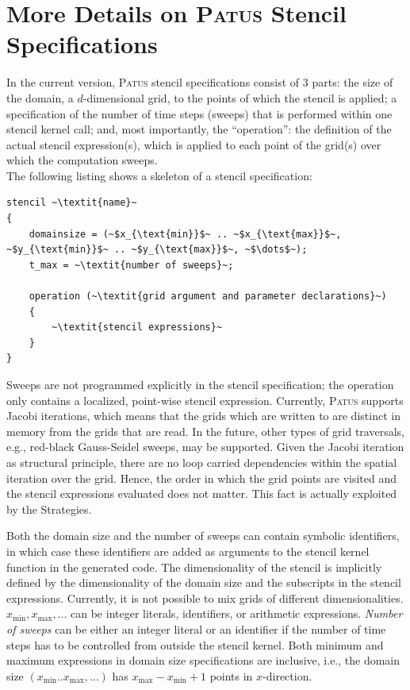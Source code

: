 \chapter{More Details on \textsc{Patus} Stencil Specifications}

In the current version, \textsc{Patus} stencil specifications consist of $3$ parts: the size of the domain,
a $d$-dimensional grid, to the points of which the stencil is applied; a specification of the number of
time steps (sweeps) that is performed within one stencil kernel call;
and, most importantly, the ``operation'': the definition of the actual stencil expression(s), which is
applied to each point of the grid(s) over which the computation sweeps.\\
The following listing shows a skeleton of a stencil specification:
\begin{lstlisting}[language=stencil]
stencil ~\textit{name}~
{
    domainsize = (~$x_{\text{min}}$~ .. ~$x_{\text{max}}$~, ~$y_{\text{min}}$~ .. ~$y_{\text{max}}$~, ~$\dots$~);
    t_max = ~\textit{number of sweeps}~;

    operation (~\textit{grid argument and parameter declarations}~)
    {
    	~\textit{stencil expressions}~
    }
}
\end{lstlisting}

Sweeps are not programmed explicitly
in the stencil specification; the operation only contains a localized, point-wise stencil expression.
Currently, \textsc{Patus} supports Jacobi iterations, which means that the
grids which are written to are distinct in memory from the grids that are read. In the future, other types
of grid traversals, e.g., red-black Gauss-Seidel sweeps, may be supported. Given the Jacobi iteration as
structural principle, there are no loop carried dependencies within the spatial iteration over the
grid. Hence, the order in which the grid points are visited and the stencil expressions evaluated does not
matter. This fact is actually exploited by the Strategies.

Both the domain size and the number of sweeps can contain symbolic identifiers, in which case these identifiers
are added as arguments to the stencil kernel function in the generated code.
The dimensionality of the stencil is implicitly defined by the dimensionality of the domain size and the
subscripts in the stencil expressions. Currently, it is not possible to mix grids of different dimensionalities.
$x_{\text{min}}, x_{\text{max}}, \dots$ can be integer literals, identifiers, or arithmetic expressions.
\textit{Number of sweeps} can be either an integer literal or an identifier if the number of time steps has to
be controlled from outside the stencil kernel. Both minimum and maximum expressions in domain size specifications
are inclusive, i.e., the domain size $(x_{\text{min}} .. x_{\text{max}}, \dots)$ has $x_{\text{max}}-x_{\text{min}}+1$
points in $x$-direction.

